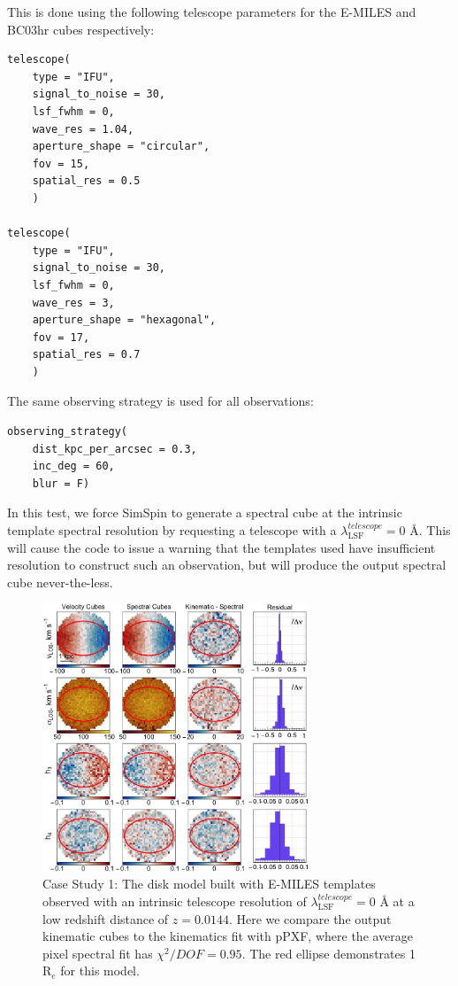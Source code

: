 \documentclass[
  journal=pasa,
  manuscript=research-paper, %
  year=2020,
  volume=37,
]{cup-journal}
\begin{document}
This is done using the following telescope parameters for the E-MILES and BC03hr cubes respectively:
\begin{lstlisting}[basicstyle=\fontsize{10}{8}\selectfont\ttfamily]
telescope(
    type = "IFU", 
    signal_to_noise = 30, 
    lsf_fwhm = 0,
    wave_res = 1.04,
    aperture_shape = "circular", 
    fov = 15,
    spatial_res = 0.5
    )

telescope(
    type = "IFU",
    signal_to_noise = 30, 
    lsf_fwhm = 0,
    wave_res = 3, 
    aperture_shape = "hexagonal",
    fov = 17,
    spatial_res = 0.7
    )
\end{lstlisting}

\noindent The same observing strategy is used for all observations:
\begin{lstlisting}[basicstyle=\fontsize{10}{8}\selectfont\ttfamily]
observing_strategy(
    dist_kpc_per_arcsec = 0.3, 
    inc_deg = 60, 
    blur = F)
\end{lstlisting}

In this test, we force SimSpin to generate a spectral cube at the intrinsic template spectral resolution by requesting a telescope with a $\lambda_{\text{LSF}}^{telescope} = 0$ \AA.
This will cause the code to issue a warning that the templates used have insufficient resolution to construct such an observation, but will produce the output spectral cube never-the-less. 

\begin{figure}
    \centering
    \includegraphics[keepaspectratio, width=8cm]{cs1_disk_velocities_lowz_EMILES.jpeg}
    \caption{Case Study 1: The disk model built with E-MILES templates observed with an intrinsic telescope resolution of  $\lambda_{\text{LSF}}^{telescope} = 0$ \AA{} at a low redshift distance of $z = 0.0144$. Here we compare the output kinematic cubes to the kinematics fit with pPXF, where the average pixel spectral fit has  $\chi^2/DOF = 0.95$. The red ellipse demonstrates 1 R$_{e}$ for this model.}
    \label{fig:cs1_disk_E-MILES}
\end{figure}
\end{document}
